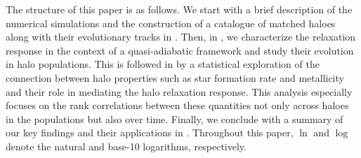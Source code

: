 The structure of this paper is as follows.
We start with a brief description of the numerical simulations and the construction of a catalogue of matched haloes along with their evolutionary tracks in . Then, in , we characterize the relaxation response in the context of a quasi-adiabatic framework and study their evolution in halo populations. This is followed in  by a statistical exploration of the connection between halo properties such as star formation rate and metallicity and their role in mediating the halo relaxation response. This analysis especially focuses on the rank correlations between these quantities not only across haloes in the populations but also over time. %
Finally, we conclude with a summary of our key findings and their applications in . Throughout this paper, $\ln$ and $\log$ denote the natural and base-10 logarithms, respectively.








